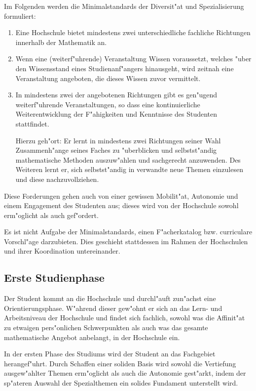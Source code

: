 \newpage
Im Folgenden werden die Minimalstandards der Diversit"at und Spezialisierung formuliert:
\begin{enumerate}
\item Eine Hochschule bietet mindestens zwei unterschiedliche fachliche Richtungen innerhalb der Mathematik an.

\item Wenn eine (weiterf"uhrende) Veranstaltung Wissen voraussetzt,
welches "uber den Wissensstand eines Studienanf"angers hinausgeht,
wird zeitnah eine Veranstaltung angeboten, die dieses Wissen zuvor vermittelt.

\item In mindestens zwei der angebotenen Richtungen gibt es gen"ugend
weiterf"uhrende Veranstaltungen, so dass eine kontinuierliche
Weiterentwicklung der F"ahigkeiten und Kenntnisse des Studenten
stattfindet.

Hierzu geh"ort: Er lernt in mindestens zwei Richtungen seiner Wahl
Zusammenh"ange seines Faches zu "uberblicken und selbstst"andig
mathematische Methoden auszuw"ahlen und sachgerecht anzuwenden.
Des Weiteren lernt er, sich selbstst"andig in verwandte neue Themen
einzulesen und diese nachzuvollziehen.
\end{enumerate}

Diese Forderungen gehen auch von einer gewissen Mobilit"at, Autonomie
und einem Engagement des Studenten aus; dieses wird von
der Hochschule sowohl erm"oglicht als auch gef"ordert.

Es ist nicht Aufgabe der Minimalstandards, einen F"acherkatalog bzw.
curriculare Vorschl"age darzubieten. Dies geschieht stattdessen im
Rahmen der Hochschulen und ihrer Koordination untereinander.




\subsection{Erste Studienphase}

Der
Student kommt an die Hochschule und durchl"auft zun"achst eine Orientierungsphase.
W"ahrend dieser gew"ohnt er sich an das Lern- und Arbeitsniveau der Hochschule und
findet sich fachlich, sowohl was die Affinit"at zu etwaigen pers"onlichen Schwerpunkten
als auch was das gesamte mathematische Angebot anbelangt, in der Hochschule ein.

In der ersten Phase des Studiums wird der Student an das Fachgebiet herangef"uhrt.
Durch Schaffen einer soliden Basis wird sowohl die Vertiefung ausgew"ahlter Themen
erm"oglicht als auch die Autonomie gest"arkt, indem der sp"ateren Auswahl der
Spezialthemen ein solides Fundament unterstellt wird.

